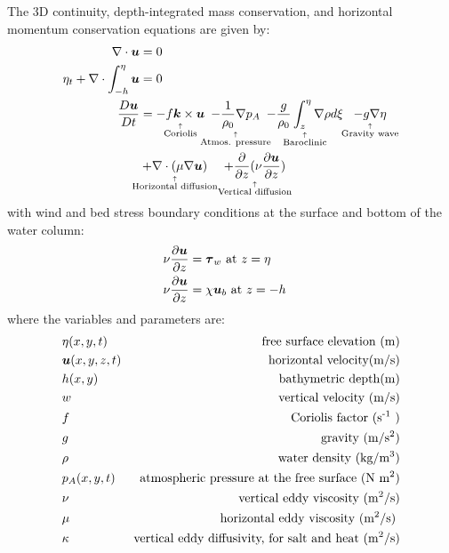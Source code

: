 The 3D continuity, depth-integrated mass conservation, and horizontal momentum conservation equations are given by:
\begin{align}
  \nabla \cdot \bs{u} &= 0 \label{3Dcon}&\\
  \eta_t+\nabla \cdot \int_{-h}^\eta \bs{u} & = 0 \label{cont1} &\\
  \frac{D\bs{u}}{Dt} &= \explain{ -f\bs{k} \times \bs{u} }{\text{Coriolis}} 
	                      \; \explain{-\frac{1}{\rho_0} \nabla p_A}{\text{Atmos. pressure}}
												\; \explain{- \frac{g}{\rho_0} \int_z^\eta \nabla \rho d \xi}{\text{Baroclinic}}
	                      \; \; \; \explain{-g\nabla \eta}{\text{Gravity wave}} & \nonumber \\
	                      \; \; \; &\explain{+ \nabla \cdot (\mu \nabla \bs{u})}{\text{Horizontal diffusion}}
												\; \; \; \; \explain{+\frac{\pd}{\pd z}(\nu \frac{\pd \bs{u}}{\pd z})}{\text{Vertical diffusion}} \label{mom1}
	\end{align}
	with wind and bed stress boundary conditions at the surface and bottom of the water column:
	\begin{align}
	\nu \frac{\partial \boldsymbol{u}}{\partial z} &= \boldsymbol{\tau}_w \mbox{ at } z=\eta &\\
  \nu \frac{\partial \boldsymbol{u}}{\partial z} &= \chi \boldsymbol{u}_b \mbox{ at } z=-h &
\end{align}
where the variables and parameters are:
\begin{align*}
&\eta(x,y,t)  &\text{free surface elevation (m)} &\\
&\boldsymbol{u}(x,y,z,t)  &\text{horizontal velocity(m/s)}  &\\
&h(x,y)  &\text{bathymetric depth(m)} &\\
&w  & \text{vertical velocity (m/s)}  &\\
&f     & \text{Coriolis factor (s\textsuperscript{-1} )} & \\
&g     & \text{gravity (m/s\textsuperscript{2})} & \\
&\rho  & \text{water density (kg/m\textsuperscript{3})} & \\
&p_A(x,y, t) & \text{atmospheric pressure at the free surface (N m\textsuperscript{2})} & \\
&\nu    & \text{vertical eddy viscosity (m\textsuperscript{2}/s)} & \\
&\mu    & \text{horizontal eddy viscosity (m\textsuperscript{2}/s) }\\
&\kappa & \text{vertical eddy diffusivity, for salt and heat (m\textsuperscript{2}/s)} & \\
\end{align*}

